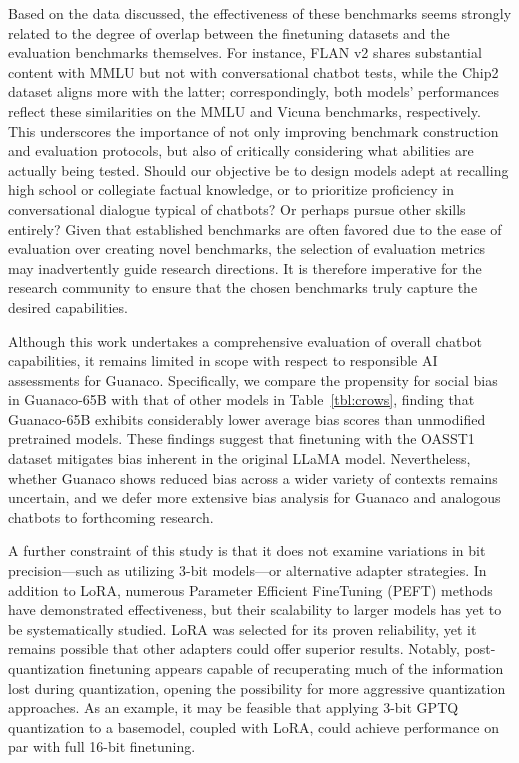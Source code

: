 Based on the data discussed, the effectiveness of these benchmarks seems strongly related to the degree of overlap between the finetuning datasets and the evaluation benchmarks themselves. For instance, FLAN v2 shares substantial content with MMLU but not with conversational chatbot tests, while the Chip2 dataset aligns more with the latter; correspondingly, both models' performances reflect these similarities on the MMLU and Vicuna benchmarks, respectively. This underscores the importance of not only improving benchmark construction and evaluation protocols, but also of critically considering what abilities are actually being tested. Should our objective be to design models adept at recalling high school or collegiate factual knowledge, or to prioritize proficiency in conversational dialogue typical of chatbots? Or perhaps pursue other skills entirely? Given that established benchmarks are often favored due to the ease of evaluation over creating novel benchmarks, the selection of evaluation metrics may inadvertently guide research directions. It is therefore imperative for the research community to ensure that the chosen benchmarks truly capture the desired capabilities.

Although this work undertakes a comprehensive evaluation of overall chatbot capabilities, it remains limited in scope with respect to responsible AI assessments for {Guanaco}. Specifically, we compare the propensity for social bias in {Guanaco}-65B with that of other models in Table~\ref{tbl:crows}, finding that {Guanaco}-65B exhibits considerably lower average bias scores than unmodified pretrained models. These findings suggest that finetuning with the OASST1 dataset mitigates bias inherent in the original LLaMA model. Nevertheless, whether {Guanaco} shows reduced bias across a wider variety of contexts remains uncertain, and we defer more extensive bias analysis for {Guanaco} and analogous chatbots to forthcoming research.

A further constraint of this study is that it does not examine variations in bit precision—such as utilizing 3-bit models—or alternative adapter strategies. In addition to LoRA, numerous Parameter Efficient FineTuning (PEFT) methods have demonstrated effectiveness, but their scalability to larger models has yet to be systematically studied. LoRA was selected for its proven reliability, yet it remains possible that other adapters could offer superior results. Notably, post-quantization finetuning appears capable of recuperating much of the information lost during quantization, opening the possibility for more aggressive quantization approaches. As an example, it may be feasible that applying 3-bit GPTQ quantization to a basemodel, coupled with LoRA, could achieve performance on par with full 16-bit finetuning.

